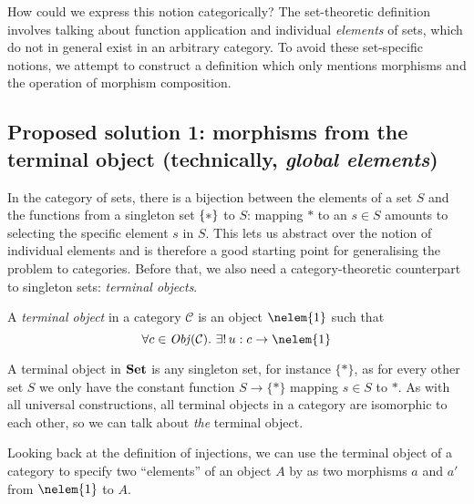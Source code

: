 How could we express this notion categorically? The set-theoretic definition
involves talking about function application and individual \emph{elements} of
sets, which do not in general exist in an arbitrary category. To avoid these
set-specific notions, we attempt to construct a definition which only mentions
morphisms and the operation of morphism composition.

\subsection{Proposed solution 1: morphisms from the terminal object
  (technically, \emph{global elements})}

In the category of sets, there is a bijection between the elements of a set
$S$ and the functions from a singleton set $\{ * \}$ to $S$: mapping $*$ to
an $s \in S$ amounts to selecting the specific element $s$ in $S$. This lets
us abstract over the notion of individual elements and is therefore a good
starting point for generalising the problem to categories. Before that, we
also need a category-theoretic counterpart to singleton sets:
\emph{terminal objects}.

\begin{definition}
A \emph{terminal object} in a category $\mathcal C$ is an object $\nelem{1}$
such that
\begin{equation*}
    \forall c \in \Ob(\mathcal C).\ \exists!\, u : c \rightarrow \nelem{1}
\end{equation*}
\end{definition}

A terminal object in $\mathbf {Set}$ is any singleton set, for instance $\{*\}$, as
for every other set $S$ we only have the constant function
$S \rightarrow \{*\}$ mapping $s \in S$ to $*$.
As with all universal constructions, all terminal objects in a category are
isomorphic to each other, so we can talk about \emph{the} terminal object.

Looking back at the definition of injections, we can use the terminal object
of a category to specify two ``elements'' of an object $A$ by as two morphisms
$a$ and $a'$ from $\nelem{1}$ to $A$.

\begin{center}
\end{center}

